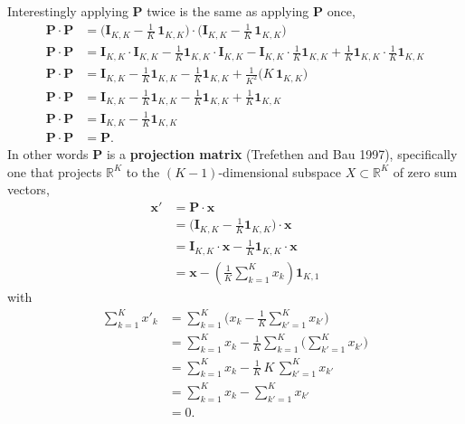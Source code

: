 \documentclass[
  letterpaper,
  DIV=11,
  numbers=noendperiod]{scrartcl}
\begin{document}
Interestingly applying \(\mathbf{P}\) twice is the same as applying
\(\mathbf{P}\) once, \begin{align*}
\mathbf{P} \cdot \mathbf{P}
&=
\bigg( \mathbf{I}_{K, K} - \frac{1}{K} \, \mathbf{1}_{K, K} \bigg)
\cdot
\bigg( \mathbf{I}_{K, K} - \frac{1}{K} \, \mathbf{1}_{K, K} \bigg)
\\
\mathbf{P} \cdot \mathbf{P}
&=
\mathbf{I}_{K, K} \cdot \mathbf{I}_{K, K}
- \frac{1}{K} \mathbf{1}_{K, K} \cdot \mathbf{I}_{K, K}
- \mathbf{I}_{K, K} \cdot \frac{1}{K} \mathbf{1}_{K, K}
+ \frac{1}{K} \mathbf{1}_{K, K} \cdot \frac{1}{K} \mathbf{1}_{K, K}
\\
\mathbf{P} \cdot \mathbf{P}
&=
\mathbf{I}_{K, K}
- \frac{1}{K} \mathbf{1}_{K, K}
- \frac{1}{K} \mathbf{1}_{K, K}
+ \frac{1}{K^{2}} \big( K \, \mathbf{1}_{K, K} \big)
\\
\mathbf{P} \cdot \mathbf{P}
&=
\mathbf{I}_{K, K}
- \frac{1}{K} \mathbf{1}_{K, K}
- \frac{1}{K} \mathbf{1}_{K, K}
+ \frac{1}{K} \mathbf{1}_{K, K}
\\
\mathbf{P} \cdot \mathbf{P}
&=
\mathbf{I}_{K, K}
- \frac{1}{K} \mathbf{1}_{K, K}
\\
\mathbf{P} \cdot \mathbf{P}
&=
\mathbf{P}.
\end{align*} In other words \(\mathbf{P}\) is a \textbf{projection
matrix} (Trefethen and Bau 1997), specifically one that projects
\(\mathbb{R}^{K}\) to the \((K - 1)\)-dimensional subspace
\(X \subset \mathbb{R}^{K}\) of zero sum vectors, \begin{align*}
\mathbf{x}'
&=
\mathbf{P} \cdot \mathbf{x}
\\
&=
\bigg( \mathbf{I}_{K, K} - \frac{1}{K} \mathbf{1}_{K, K} \bigg) \cdot \mathbf{x}
\\
&=
\mathbf{I}_{K, K} \cdot \mathbf{x} - \frac{1}{K} \mathbf{1}_{K, K} \cdot \mathbf{x}
\\
&=
\mathbf{x} - \left( \frac{1}{K} \sum_{k = 1}^{K} x_{k} \right) \mathbf{1}_{K, 1}
\end{align*} with \begin{align*}
\sum_{k = 1}^{K} x'_{k}
&=
\sum_{k = 1}^{K} \bigg( x_{k} - \frac{1}{K} \sum_{k' = 1}^{K} x_{k'} \bigg)
\\
&=
\sum_{k = 1}^{K} x_{k} - \frac{1}{K} \sum_{k = 1}^{K} \bigg( \sum_{k' = 1}^{K} x_{k'} \bigg)
\\
&=
\sum_{k = 1}^{K} x_{k} - \frac{1}{K} \, K \, \sum_{k' = 1}^{K} x_{k'}
\\
&=
\sum_{k = 1}^{K} x_{k} - \sum_{k' = 1}^{K} x_{k'}
\\
&=
0.
\end{align*}
\end{document}
